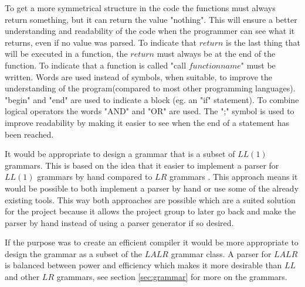 To get a more symmetrical structure in the code the functions must always return something, but it can return the value "nothing". This will ensure a better understanding and readability of the code when the programmer can see what it returns, even if no value was parsed. To indicate that $return$ is the last thing that will be executed in a function, the $return$ must always be at the end of the function. To indicate that a function is called "call $functionname$" must be written.
Words are used instead of symbols, when suitable, to improve the understanding of the program(compared to most other programming languages).
"begin" and "end" are used to indicate a block (eg. an "if" statement). To combine logical operators the words "AND" and "OR" are used. The ";" symbol is used to improve readability by making it easier to see when the end of a statement has been reached.

It would be appropriate to design a grammar that is a subset of $LL(1)$ grammars. This is based on the idea that it easier to implement a parser for $LL(1)$ grammars by hand compared to $LR$ grammars \citep{CraftingACompiler}. This approach means it would be possible to both implement a parser by hand or use some of the already existing tools. This way both approaches are possible which are a suited solution for the project because it allows the project group to later go back and make the parser by hand instead of using a parser generator if so desired.

If the purpose was to create an efficient compiler it would be more appropriate to design the grammar as a subset of the $LALR$ grammar class. A parser for $LALR$ is balanced between power and efficiency which makes it more desirable than $LL$ and other $LR$ grammars, see section \ref{sec:grammar} for more on the grammars. %
